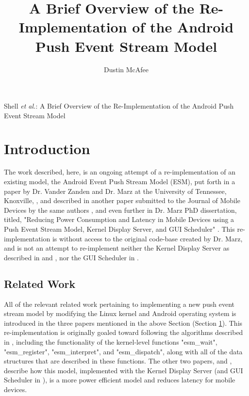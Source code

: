\documentclass[10pt,journal,compsoc]{IEEEtran}
\begin{document}
\title{A Brief Overview of the Re-Implementation of the Android Push Event Stream Model}
\author{Dustin McAfee}

{Shell \MakeLowercase{\textit{et al.}}: A Brief Overview of the Re-Implementation of the Android Push Event Stream Model}



\maketitle

\IEEEdisplaynontitleabstractindextext
\IEEEpeerreviewmaketitle

\ifCLASSOPTIONcompsoc
{}
\else
\section{Introduction}
\label{sec:introduction}
\fi
The work described, here, is an ongoing attempt of a re-implementation of an existing model, the Android Event Push Stream Model (ESM), put forth in a paper by Dr. Vander Zanden and Dr. Marz at the University of Tennessee, Knoxville, \cite{Marz_BVZ_ESM}, and described in another paper submitted to the Journal of Mobile Devices by the same authors \cite{8413093}, and even further in Dr. Marz PhD dissertation, titled, "Reducing Power Consumption and Latency in Mobile Devices using a Push Event Stream Model, Kernel Display Server, and GUI Scheduler" \cite{Marz2018ReducingPC}. This re-implementation is without access to the original code-base created by Dr. Marz, and is not an attempt to re-implement neither the Kernel Display Server as described in \cite{8413093} and \cite{Marz2018ReducingPC}, nor the GUI Scheduler in \cite{Marz2018ReducingPC}.

\subsection{Related Work}
\label{sec:relatedwork}
All of the relevant related work pertaining to implementing a new push event stream model by modifying the Linux kernel and Android operating system is introduced in the three papers mentioned in the above Section (Section \ref{sec:introduction}). This re-implementation is originally goaled toward following the algorithms described in \cite{Marz_BVZ_ESM}, including the functionality of the kernel-level functions "esm\_wait", "esm\_register", "esm\_interpret", and "esm\_dispatch", along with all of the data structures that are described in these functions. The other two papers, \cite{8413093} and \cite{Marz2018ReducingPC}, describe how this model, implemented with the Kernel Display Server (and GUI Scheduler in \cite{Marz2018ReducingPC}), is a more power efficient model and reduces latency for mobile devices.
\end{document}
